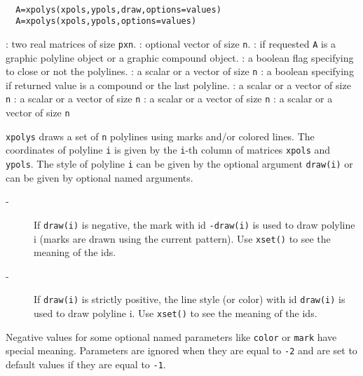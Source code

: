 \begin{mandesc}
  \\ %
\end{mandesc}
\begin{calling_sequence}
\begin{verbatim}
  A=xpolys(xpols,ypols,draw,options=values)
  A=xpolys(xpols,ypols,options=values)
\end{verbatim}
\end{calling_sequence}

\begin{parameters}
  \begin{varlist}
    : two real matrices of size \verb!pxn!.
    : optional vector of size \verb!n!.
    : if requested \verb!A! is a graphic polyline object or a graphic compound object.
    : a boolean flag specifying to close or not the polylines.
    : a scalar or a vector of size \verb!n!
    : a boolean  specifying if returned value is a compound or the last polyline.
    :  a scalar or a vector of size \verb!n!
    : a scalar or a vector of size \verb!n!
    :  a scalar or a vector of size \verb!n!
    :  a scalar or a vector of size \verb!n!
  \end{varlist}
\end{parameters}
\begin{mandescription}
  \verb!xpolys! draws a set of \verb!n! polylines using marks and/or colored lines.
  The coordinates of polyline \verb!i! is given by the \verb!i!-th
  column of matrices \verb!xpols! and \verb!ypols!.
  The style of polyline \verb!i! can be given by the optional argument \verb!draw(i)!
  or can be given by optional named arguments.

  \begin{description}
  \item[-] If \verb!draw(i)! is negative, the mark with id \verb!-draw(i)! is
    used to draw polyline i (marks are drawn using the current pattern). Use
    \verb!xset()! to see the meaning of the ids.
  \item[-] If \verb!draw(i)! is strictly positive, the line style (or color)
    with id \verb!draw(i)! is used to draw polyline i. Use \verb!xset()! to see
    the meaning of the ids.
  \end{description}

  Negative values for some optional named parameters like \verb!color! or
  \verb!mark! have special meaning.
  Parameters are ignored when they are equal to \verb!-2!
  and are set to default values if they are equal to \verb!-1!.
\end{mandescription}

